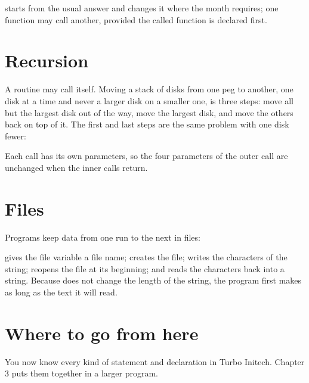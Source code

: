 

 starts from the usual answer and changes it where the month
requires; one function may call another, provided the called function is
declared first.

\section{Recursion}
A routine may call itself.  Moving a stack of disks from one peg to
another, one disk at a time and never a larger disk on a smaller one, is
three steps: move all but the largest disk out of the way, move the largest
disk, and move the others back on top of it.  The first and last steps are
the same problem with one disk fewer:



Each call has its own parameters, so the four parameters of the outer call
are unchanged when the inner calls return.

\section{Files}
Programs keep data from one run to the next in files:



 gives the file variable a file name;
 creates the file; 
writes the characters of the string;  reopens the file at
its beginning; and  reads the characters back into
a string.  Because  does not change the length of
the string, the program first makes  as long as the text it will
read.

\section{Where to go from here}
You now know every kind of statement and declaration in Turbo Initech.
Chapter 3 puts them together in a larger program.
